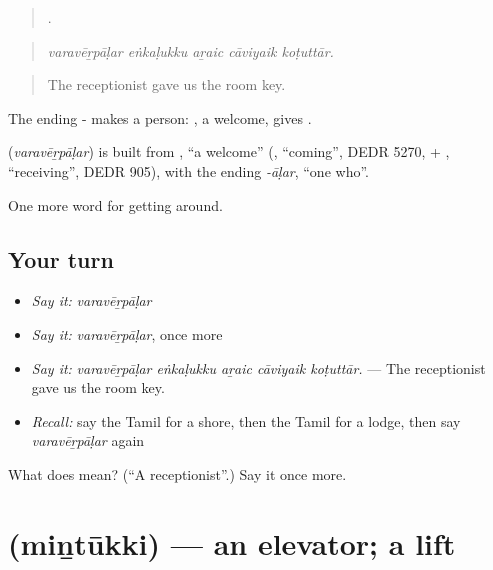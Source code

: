 \begin{quote}
    .
\end{quote}

\begin{quote}
\emph{varavēṟpāḷar eṅkaḷukku aṟaic cāviyaik koṭuttār.}
\end{quote}

\begin{quote}
The receptionist gave us the room key.
\end{quote}

The ending - makes a person: , a welcome, gives .

\begin{cousinweb}
\textbf{} (\emph{varavēṟpāḷar}) is built from , \textquotedblleft{}a welcome\textquotedblright{} (, \textquotedblleft{}coming\textquotedblright{}, DEDR 5270, + , \textquotedblleft{}receiving\textquotedblright{}, DEDR 905), with the ending \emph{-āḷar}, \textquotedblleft{}one who\textquotedblright{}.
\end{cousinweb}

\begin{grammarlens}[title={What you've built}]
One more word for getting around.
\end{grammarlens}

\subsection*{Your turn}
\begin{itemize}
\raggedright
  \item \emph{Say it:} \emph{varavēṟpāḷar}
  \item \emph{Say it:} \emph{varavēṟpāḷar}, once more
  \item \emph{Say it:} \emph{varavēṟpāḷar eṅkaḷukku aṟaic cāviyaik koṭuttār.} — The receptionist gave us the room key.
  \item \emph{Recall:} say the Tamil for a shore, then the Tamil for a lodge, then say \emph{varavēṟpāḷar} again
\end{itemize}

\begin{tcolorbox}[breakable,colback=teal!4,colframe=teal!35!black,title={Before you move on}]
What does  mean? (\textquotedblleft{}A receptionist\textquotedblright{}.) Say it once more.
\end{tcolorbox}
\section[\texorpdfstring{\ta{மின்தூக்கி} (miṉtūkki)}{மின்தூக்கி (miṉtūkki)}]{ (miṉtūkki) — an elevator; a lift}

